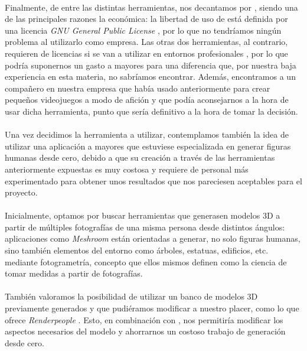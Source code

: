\documentclass{subfiles}
\begin{document}
    \paragraph{}
    Finalmente, de entre las distintas herramientas, nos decantamos por \blender, siendo una de las principales razones la económica: la libertad de uso de \blender está definida por una licencia \textit{GNU General Public License} \cite{web:blender_license,web:gnulicense}, por lo que no tendríamos ningún problema al utilizarlo como empresa. Las otras dos herramientas, al contrario, requieren de licencias si se van a utilizar en entornos profesionales \cite{web:unity_pricing,web:unreal_licensing}, por lo que podría suponernos un gasto a mayores para una diferencia que, por nuestra baja experiencia en esta materia, no sabríamos encontrar. Además, encontramos a un compañero en nuestra empresa que había usado \blender anteriormente para crear pequeños videojuegos a modo de afición y que podía aconsejarnos a la hora de usar dicha herramienta, punto que sería definitivo a la hora de tomar la decisión.

    \paragraph{}
    Una vez decidimos la herramienta a utilizar, contemplamos también la idea de utilizar una aplicación a mayores que estuviese especializada en generar figuras humanas desde cero, debido a que su creación a través de las herramientas anteriormente expuestas es muy costosa y requiere de personal más experimentado para obtener unos resultados que nos pareciesen aceptables para el proyecto.
    
    \paragraph{}
    Inicialmente, optamos por buscar herramientas que generasen modelos 3D a partir de múltiples fotografías de una misma persona desde distintos ángulos: aplicaciones como \textit{Meshroom} \cite{web:meshroom} están orientadas a generar, no solo figuras humanas, sino también elementos del entorno como árboles, estatuas, edificios, etc. mediante fotogrametría, concepto que ellos mismos definen como la ciencia de tomar medidas a partir de fotografías.

    \paragraph{}
    También valoramos la posibilidad de utilizar un banco de modelos 3D previamente generados y que pudiéramos modificar a nuestro placer, como lo que ofrece \textit{Renderpeople} \cite{web:renderpeople}. Esto, en combinación con \blender, nos permitiría modificar los aspectos necesarios del modelo y ahorrarnos un costoso trabajo de generación desde cero.
\end{document}
